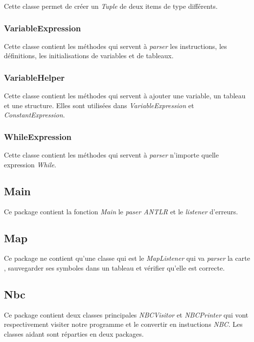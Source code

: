 Cette classe permet de créer un \emph{Tuple} de deux items de type différents.

\subsubsection{VariableExpression}

Cette classe contient les méthodes qui servent à \emph{parser} les instructions, les définitions, les initialisations de variables et de tableaux.

\subsubsection{VariableHelper}

Cette classe contient les méthodes qui servent à ajouter une variable, un tableau et une structure. Elles sont utilisées dans \emph{VariableExpression} et \emph{ConstantExpression}.

\subsubsection{WhileExpression}

Cette classe contient les méthodes qui servent à \emph{parser} n'importe quelle expression \emph{While}.

\subsection{Main}

Ce package contient la fonction \emph{Main} le \emph{paser ANTLR} et le \emph{listener} d'erreurs.

\subsection{Map}

Ce package ne contient qu'une classe qui est le \emph{MapListener} qui va \emph{parser} la carte , sauvegarder ses symboles dans un tableau et vérifier qu'elle est correcte.

\subsection{Nbc}

Ce package contient deux classes principales \emph{NBCVisitor} et \emph{NBCPrinter} qui vont respectivement visiter notre programme et le convertir en instuctions \emph{NBC}. Les classes aidant sont réparties en deux packages.

